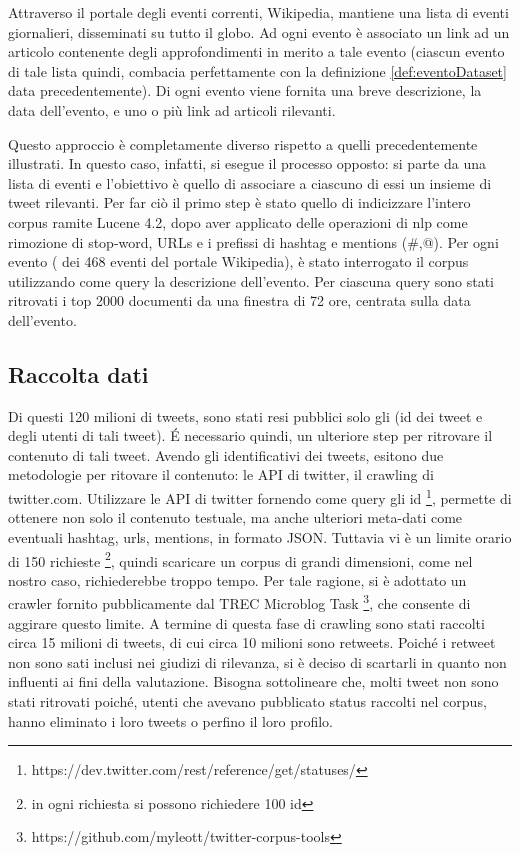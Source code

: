 Attraverso il portale degli eventi correnti, Wikipedia, mantiene una lista di eventi giornalieri, disseminati su tutto il globo. Ad ogni evento è associato un link ad un articolo contenente degli approfondimenti in merito a tale evento (ciascun evento di tale lista quindi, combacia perfettamente con la definizione \ref {def:eventoDataset} data precedentemente). 
Di ogni evento viene fornita una breve descrizione, la data dell'evento, e uno o più link ad articoli rilevanti. 

Questo approccio è completamente diverso rispetto a quelli precedentemente illustrati. In questo caso, infatti, si esegue il processo opposto: si parte da una lista di eventi e l'obiettivo è quello di associare a ciascuno di essi un insieme di tweet rilevanti.
Per far ciò il primo step è stato quello di indicizzare l'intero corpus ramite Lucene 4.2, dopo aver applicato delle operazioni di nlp come rimozione di stop-word, URLs e i prefissi di hashtag e mentions (\#,@). 
 Per ogni evento ( dei 468 eventi del portale Wikipedia), è stato interrogato il corpus utilizzando  come query la descrizione dell'evento. Per ciascuna query sono stati ritrovati i top 2000 documenti da una finestra di 72 ore, centrata sulla data dell'evento.
 

\subsection{Raccolta dati}
Di questi 120 milioni di tweets, sono stati resi pubblici solo gli (id dei tweet e degli utenti di tali tweet).  \'E necessario quindi, un ulteriore step per ritrovare il contenuto di tali tweet.
Avendo gli identificativi dei tweets, esitono due metodologie per ritovare il contenuto: le API di twitter, il crawling di twitter.com.
Utilizzare le API di twitter fornendo come query gli id \footnote{https://dev.twitter.com/rest/reference/get/statuses/}, permette di ottenere non solo il contenuto testuale, ma anche ulteriori meta-dati come eventuali hashtag, urls, mentions, in formato JSON.
Tuttavia vi è un limite orario di 150 richieste \footnote{in ogni richiesta si possono richiedere 100 id}, quindi scaricare un corpus di grandi dimensioni, come nel nostro caso, richiederebbe troppo tempo. Per tale ragione, si è adottato un crawler fornito pubblicamente dal TREC Microblog Task \footnote{https://github.com/myleott/twitter-corpus-tools}, che consente di aggirare questo limite. A termine di questa fase di crawling sono stati raccolti circa 15 milioni di tweets, di cui  circa 10 milioni  sono retweets. Poiché i retweet non sono sati inclusi nei giudizi di rilevanza, si è deciso di scartarli in quanto non influenti ai fini della valutazione. Bisogna sottolineare che,  molti tweet non sono stati ritrovati poiché, utenti che avevano pubblicato status raccolti nel corpus, hanno eliminato i loro tweets o perfino il loro profilo.



